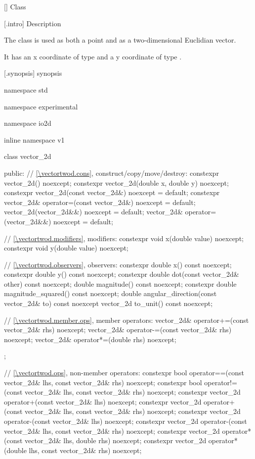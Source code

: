  [\vectortwod] {Class }

 [\vectortwod.intro] { Description}

\pnum
The class  is used as both a point and as a two-dimensional Euclidian vector.

\pnum
It has an x coordinate of type  and a y coordinate of type .

 [\vectortwod.synopsis] { synopsis}

\begin{codeblock}
namespace std { namespace experimental { namespace io2d { inline namespace v1 {
  class vector_2d {
  public:
    // \ref{\vectortwod.cons}, construct/copy/move/destroy:
    constexpr vector_2d() noexcept;
    constexpr vector_2d(double x, double y) noexcept;
    constexpr vector_2d(const vector_2d&) noexcept = default;
    constexpr vector_2d& operator=(const vector_2d&) noexcept = default;
    vector_2d(vector_2d&&) noexcept = default;
    vector_2d& operator=(vector_2d&&) noexcept = default;

    // \ref{\vectortwod.modifiers}, modifiers:
    constexpr void x(double value) noexcept;
    constexpr void y(double value) noexcept;
    
    // \ref{\vectortwod.observers}, observers:
    constexpr double x() const noexcept;
    constexpr double y() const noexcept;
    constexpr double dot(const vector_2d& other) const noexcept;
    double magnitude() const noexcept;
    constexpr double magnitude_squared() const noexcept;
    double angular_direction(const vector_2d& to) const noexcept
    vector_2d to_unit() const noexcept;
    
    // \ref{\vectortwod.member.ops}, member operators:
    vector_2d& operator+=(const vector_2d& rhs) noexcept;
    vector_2d& operator-=(const vector_2d& rhs) noexcept;
    vector_2d& operator*=(double rhs) noexcept;
  };
  
  // \ref{\vectortwod.ops}, non-member operators:
  constexpr bool operator==(const vector_2d& lhs, const vector_2d& rhs)
    noexcept;
  constexpr bool operator!=(const vector_2d& lhs, const vector_2d& rhs)
    noexcept;
  constexpr vector_2d operator+(const vector_2d& lhs) noexcept;
  constexpr vector_2d operator+(const vector_2d& lhs, const vector_2d& rhs)
    noexcept;
  constexpr vector_2d operator-(const vector_2d& lhs) noexcept;
  constexpr vector_2d operator-(const vector_2d& lhs, const vector_2d& rhs)
    noexcept;
  constexpr vector_2d operator*(const vector_2d& lhs, double rhs) noexcept;
  constexpr vector_2d operator*(double lhs, const vector_2d& rhs) noexcept;
} } } }
\end{codeblock}

